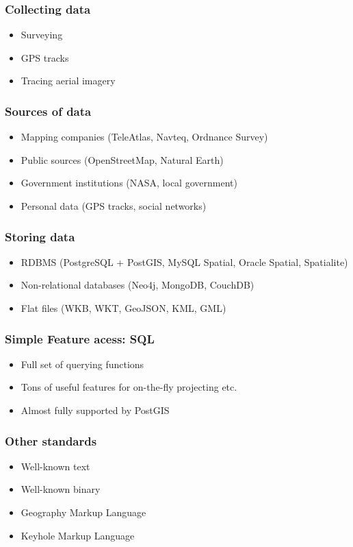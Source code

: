 \documentclass{beamer}
\begin{document}
\begin{frame}
  \frametitle{Collecting data}
  \begin{itemize}
  \item Surveying
  \item GPS tracks
  \item Tracing aerial imagery
  \end{itemize}
\end{frame}

\begin{frame}
  \frametitle{Sources of data}
  \begin{itemize}
  \item Mapping companies (TeleAtlas, Navteq, Ordnance Survey)
  \item Public sources (OpenStreetMap, Natural Earth)
  \item Government institutions (NASA, local government)
  \item Personal data (GPS tracks, social networks)
  \end{itemize}
\end{frame}

\begin{frame}
  \frametitle{Storing data}
  \begin{itemize}
  \item RDBMS (PostgreSQL + PostGIS, MySQL Spatial, Oracle Spatial, Spatialite)
  \item Non-relational databases (Neo4j, MongoDB, CouchDB)
  \item Flat files (WKB, WKT, GeoJSON, KML, GML)
  \end{itemize}
\end{frame}

\begin{frame}
  \frametitle{Simple Feature acess: SQL}
  \begin{itemize}
  \item Full set of querying functions
  \item Tons of useful features for on-the-fly projecting etc.
  \item Almost fully supported by PostGIS
  \end{itemize}
\end{frame}

\begin{frame}
  \frametitle{Other standards}
  \begin{itemize}
  \item Well-known text
  \item Well-known binary
  \item Geography Markup Language
  \item Keyhole Markup Language
  \end{itemize}
\end{frame}
\end{document}
